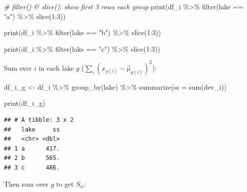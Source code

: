 \documentclass[
]{article}
\newenvironment{Shaded}{\begin{snugshade}}{\end{snugshade}}
\newcommand{\AttributeTok}[1]{\textcolor[rgb]{0.77,0.63,0.00}{#1}}
\newcommand{\CommentTok}[1]{\textcolor[rgb]{0.56,0.35,0.01}{\textit{#1}}}
\newcommand{\DecValTok}[1]{\textcolor[rgb]{0.00,0.00,0.81}{#1}}
\newcommand{\FunctionTok}[1]{\textcolor[rgb]{0.00,0.00,0.00}{#1}}
\newcommand{\NormalTok}[1]{#1}
\newcommand{\OtherTok}[1]{\textcolor[rgb]{0.56,0.35,0.01}{#1}}
\newcommand{\SpecialCharTok}[1]{\textcolor[rgb]{0.00,0.00,0.00}{#1}}
\newcommand{\StringTok}[1]{\textcolor[rgb]{0.31,0.60,0.02}{#1}}
\begin{document}
\begin{Shaded}
\begin{Highlighting}[]
\CommentTok{\# filter() \& slice(): show first 3 rows each group}
\FunctionTok{print}\NormalTok{(df\_i }\SpecialCharTok{\%\textgreater{}\%} \FunctionTok{filter}\NormalTok{(lake }\SpecialCharTok{==} \StringTok{"a"}\NormalTok{) }\SpecialCharTok{\%\textgreater{}\%} \FunctionTok{slice}\NormalTok{(}\DecValTok{1}\SpecialCharTok{:}\DecValTok{3}\NormalTok{))}

\FunctionTok{print}\NormalTok{(df\_i }\SpecialCharTok{\%\textgreater{}\%} \FunctionTok{filter}\NormalTok{(lake }\SpecialCharTok{==} \StringTok{"b"}\NormalTok{) }\SpecialCharTok{\%\textgreater{}\%} \FunctionTok{slice}\NormalTok{(}\DecValTok{1}\SpecialCharTok{:}\DecValTok{3}\NormalTok{))}

\FunctionTok{print}\NormalTok{(df\_i }\SpecialCharTok{\%\textgreater{}\%} \FunctionTok{filter}\NormalTok{(lake }\SpecialCharTok{==} \StringTok{"c"}\NormalTok{) }\SpecialCharTok{\%\textgreater{}\%} \FunctionTok{slice}\NormalTok{(}\DecValTok{1}\SpecialCharTok{:}\DecValTok{3}\NormalTok{))}
\end{Highlighting}
\end{Shaded}

Sum over \(i\) in each lake \(g\) (\(\sum_i (x_{g(i)} - \hat{\mu}_{g(i)})^2\)):

\begin{Shaded}
\begin{Highlighting}[]
\NormalTok{df\_i\_g }\OtherTok{\textless{}{-}}\NormalTok{ df\_i }\SpecialCharTok{\%\textgreater{}\%} 
  \FunctionTok{group\_by}\NormalTok{(lake) }\SpecialCharTok{\%\textgreater{}\%} 
  \FunctionTok{summarize}\NormalTok{(}\AttributeTok{ss =} \FunctionTok{sum}\NormalTok{(dev\_i))}

\FunctionTok{print}\NormalTok{(df\_i\_g)}
\end{Highlighting}
\end{Shaded}

\begin{verbatim}
## # A tibble: 3 x 2
##   lake     ss
##   <chr> <dbl>
## 1 a      417.
## 2 b      565.
## 3 c      486.
\end{verbatim}

Then sum over \(g\) to get \(S_w\):

\begin{Shaded}
\end{Shaded}
\end{document}
